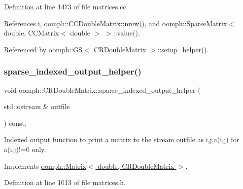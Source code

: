 Definition at line 1473 of file matrices.\+cc.



References i, oomph\+::\+C\+C\+Double\+Matrix\+::nrow(), and oomph\+::\+Sparse\+Matrix$<$ double, C\+C\+Matrix$<$ double $>$ $>$\+::value().



Referenced by oomph\+::\+G\+S$<$ C\+R\+Double\+Matrix $>$\+::setup\+\_\+helper().

\mbox{\label{classoomph_1_1CRDoubleMatrix_a468055aa2e36ff270a769a74c9ac2856}} 
\subsubsection{\texorpdfstring{sparse\+\_\+indexed\+\_\+output\+\_\+helper()}{sparse\_indexed\_output\_helper()}}
{\footnotesize\ttfamily void oomph\+::\+C\+R\+Double\+Matrix\+::sparse\+\_\+indexed\+\_\+output\+\_\+helper (\begin{DoxyParamCaption}\item[{std\+::ostream \&}]{outfile }\end{DoxyParamCaption}) const\hspace{0.3cm}{\ttfamily [inline]}, {\ttfamily [virtual]}}



Indexed output function to print a matrix to the stream outfile as i,j,a(i,j) for a(i,j)!=0 only. 



Implements \hyperlink{classoomph_1_1Matrix_a7a5b44e7688ce2c2f7552da104e615c8}{oomph\+::\+Matrix$<$ double, C\+R\+Double\+Matrix $>$}.



Definition at line 1013 of file matrices.\+h.

\mbox{\label{classoomph_1_1CRDoubleMatrix_a2b5dcdc5e1b9ccea51647f02b3239e66}} 
